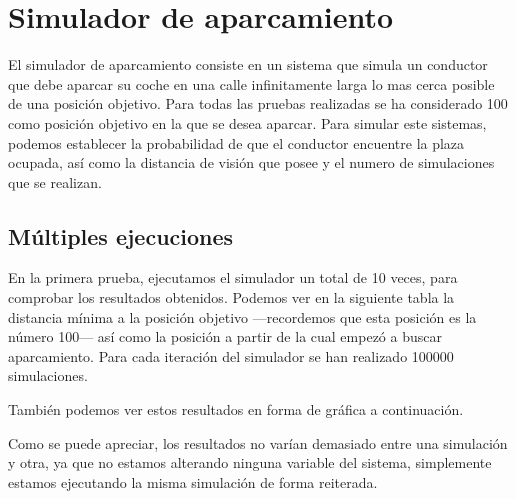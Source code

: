 \chapter{Simulador de aparcamiento}
El simulador de aparcamiento consiste en un sistema que simula un conductor que debe aparcar su coche en una calle infinitamente larga lo mas cerca posible de una posición objetivo. Para todas las pruebas realizadas se ha considerado 100 como posición objetivo en la que se desea aparcar. Para simular este sistemas, podemos establecer la probabilidad de que el conductor encuentre la plaza ocupada, así como la distancia de visión que posee y el numero de simulaciones que se realizan.
\section{Múltiples ejecuciones}
En la primera prueba, ejecutamos el simulador un total de 10 veces, para comprobar los resultados obtenidos. Podemos ver en la siguiente tabla la distancia mínima a la posición objetivo ---recordemos que esta posición es la número 100--- así como la posición a partir de la cual empezó a buscar aparcamiento. Para cada iteración del simulador se han realizado 100000 simulaciones.
\begin{table}[h]
\centering
{}
\end{table}

También podemos ver estos resultados en forma de gráfica a continuación.

Como se puede apreciar, los resultados no varían demasiado entre una simulación y otra, ya que no estamos alterando ninguna variable del sistema, simplemente estamos ejecutando la misma simulación de forma reiterada.

